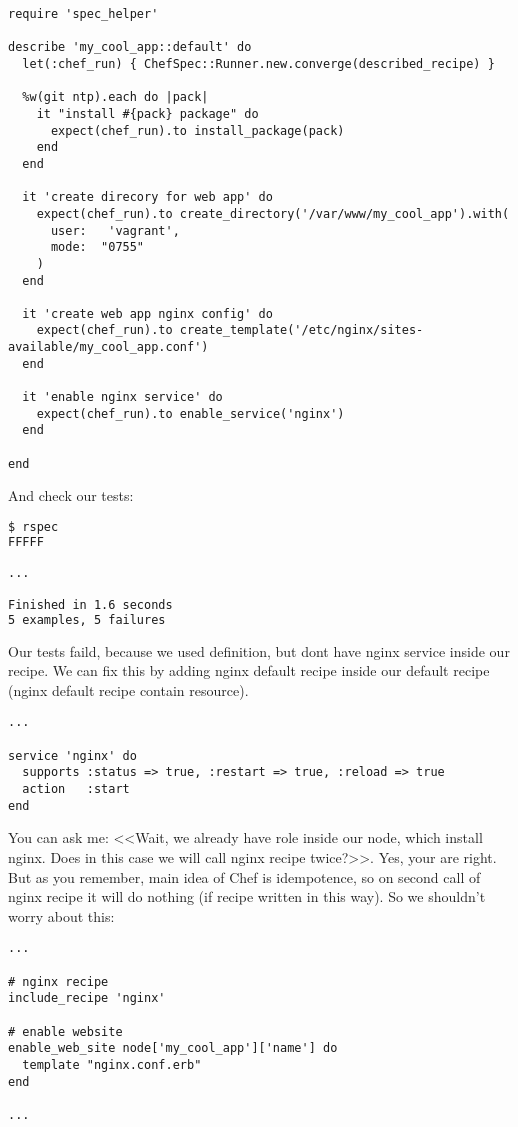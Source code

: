 \begin{lstlisting}[label=lst:testing-chefspec3,title=my-server-cloud/site-cookbooks/my\_cool\_app/spec/unit/recipes/default\_spec.rb]
require 'spec_helper'

describe 'my_cool_app::default' do
  let(:chef_run) { ChefSpec::Runner.new.converge(described_recipe) }

  %w(git ntp).each do |pack|
    it "install #{pack} package" do
      expect(chef_run).to install_package(pack)
    end
  end

  it 'create direcory for web app' do
    expect(chef_run).to create_directory('/var/www/my_cool_app').with(
      user:   'vagrant',
      mode:  "0755"
    )
  end

  it 'create web app nginx config' do
    expect(chef_run).to create_template('/etc/nginx/sites-available/my_cool_app.conf')
  end

  it 'enable nginx service' do
    expect(chef_run).to enable_service('nginx')
  end

end
\end{lstlisting}

And check our tests:

\begin{lstlisting}[language=Bash,label=lst:testing-chefspec5]
$ rspec
FFFFF

...

Finished in 1.6 seconds
5 examples, 5 failures
\end{lstlisting}

Our tests faild, because we used  definition, but dont have nginx service inside our recipe. We can fix this by adding nginx default recipe inside our default recipe (nginx default recipe contain  resource).

\begin{lstlisting}[label=lst:testing-chefspec-nginx]
...

service 'nginx' do
  supports :status => true, :restart => true, :reload => true
  action   :start
end
\end{lstlisting}

You can ask me: <<Wait, we already have role  inside our node, which install nginx. Does in this case we will call nginx recipe twice?>>. Yes, your are right. But as you remember, main idea of Chef is idempotence, so on second call of nginx recipe it will do nothing (if recipe written in this way). So we shouldn't worry about this:

\begin{lstlisting}[label=lst:testing-chefspec6,title=my-server-cloud/site-cookbooks/my\_cool\_app/recipes/default.rb]
...

# nginx recipe
include_recipe 'nginx'

# enable website
enable_web_site node['my_cool_app']['name'] do
  template "nginx.conf.erb"
end

...
\end{lstlisting}

